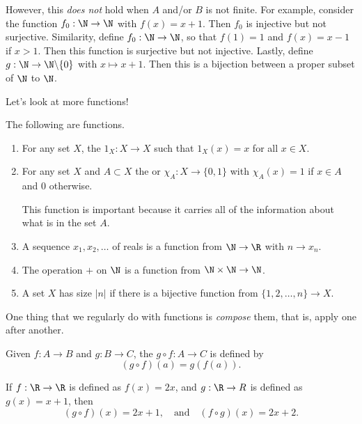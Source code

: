 \documentclass[a4paper]{scrreprt}
\begin{document}
However, this \emph{does not} hold when $A$ and/or $B$ is not finite. For example, consider the function $f_0: \N \rightarrow \N$ with $f(x) = x + 1$. Then $f_0$ is injective but not surjective.
Similarity, define $f_0 : \N \rightarrow \N$, so that $f(1) = 1$ and $f(x) = x - 1$ if $x > 1$. Then this function is surjective but not injective. Lastly, define $g: \N \rightarrow \N \backslash \{0\}$ with $x \mapsto x + 1$. Then this is a bijection between a proper subset of $\N$ to $\N$.

Let's look at more functions!

\begin{example}
	The following are functions.
	\begin{enumerate}[label=(\roman*)]
		\item For any set $X$, the  $1_X : X  \rightarrow X$ such that $1_X(x) = x$ for all $x \in X$.
		\item For any set $X$ and $A \subset X$ the  or  $\chi_A: X \rightarrow \{0, 1\}$ with $\chi_A(x) = 1$ if $x \in A$ and 0 otherwise.
		
		This function is important because it carries all of the information about what is in the set $A$.
		\item A sequence $x_1, x_2, \dots$ of reals is a function from $\N \rightarrow \R$ with $n \rightarrow x_n$.
		\item The operation $+$ on $\N$ is a function from $\N \times \N \rightarrow \N$.
		\item A set $X$ has size $|n|$ if there is a bijective function from $\{1, 2, \dots, n\} \rightarrow X$.
	\end{enumerate}
\end{example}

One thing that we regularly do with functions is \emph{compose} them, that is, apply one after another.

\begin{definition}
	Given $f : A \rightarrow B$ and $g : B \rightarrow C$, the  $g \circ f : A \rightarrow C$ is defined by
	$$
	(g \circ f)(a) = g(f(a)).
	$$
\end{definition}

\begin{example}
	If $f: \R \rightarrow \R$ is defined as $f(x) = 2x$, and $g: \R \rightarrow R$ is defined as $g(x) = x + 1$, then
	$$
	(g \circ f)(x) = 2x + 1, \quad \text{and}\quad (f \circ g)(x) = 2x + 2.
	$$
\end{example}
\end{document}
